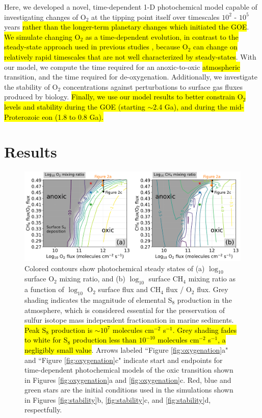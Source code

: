 \documentclass[9pt,twocolumn,twoside,lineno]{pnas-new}
\begin{document}
Here, we developed a novel, time-dependent 1-D photochemical model capable of investigating changes of O$_2$ at the tipping point itself over timescales $10^2$ - $10^5$ years \hl{rather than the longer-term planetary changes which initiated the GOE}. \hl{We simulate changing O$_2$ as a time-dependent evolution, in contrast to the steady-state approach used in previous studies \mbox{\cite[e.g.][]{Kasting_1980}}, because O$_2$ can change on relatively rapid timescales that are not well characterized by steady-states}. With our model, we compute the time required for an anoxic-to-oxic \hl{atmospheric} transition, and the time required for de-oxygenation. Additionally, we investigate the stability of O$_2$ concentrations against perturbations to surface gas fluxes produced by biology. \hl{Finally, we use our model results to better constrain O$_2$ levels and stability during the GOE (starting $\sim$2.4 Ga), and during the mid-Proterozoic eon (1.8 to 0.8 Ga).}

\section*{Results}

\begin{figure}
    \centering
    \includegraphics[width=\textwidth]{ArcheanOutgassing_sweep.pdf}
    \caption{Colored contours show photochemical steady states of (a) $\log_{10}$ surface O$_2$ mixing ratio, and (b) $\log_{10}$ surface CH$_4$ mixing ratio as a function of $\log_{10}$ O$_2$ surface flux and CH$_4$ flux / O$_2$ flux. Grey shading indicates the magnitude of elemental S$_8$ production in the atmosphere, which is considered essential for the preservation of sulfur isotope mass independent fractionation in marine sediments. \hl{Peak S$_8$ production is $\sim10^7$ molecules cm$^{-2}$ s$^{-1}$. Grey shading fades to white for S$_8$ production less than $10^{-10}$ molecules cm$^{-2}$ s$^{-1}$, a negligibly small value}. Arrows labeled ``Figure \ref{fig:oxygenation}a" and ``Figure \ref{fig:oxygenation}c" indicate start and endpoints for time-dependent photochemical models of the oxic transition shown in Figures \ref{fig:oxygenation}a and \ref{fig:oxygenation}c. Red, blue and green stars are the initial conditions used in the simulations shown in Figures \ref{fig:stability}b, \ref{fig:stability}c, and \ref{fig:stability}d, respectfully.}
    \label{fig:sweep}
\end{figure}
\end{document}
